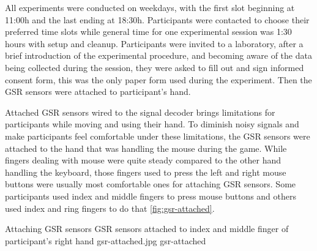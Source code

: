 All experiments were conducted on weekdays, with the first slot beginning at 11:00h and the last ending at 18:30h. Participants were contacted to choose their preferred time slots while general time for one experimental session was 1:30 hours with setup and cleanup. Participants were invited to a laboratory, after a brief introduction of the experimental procedure, and becoming aware of the data being collected during the session, they were asked to fill out and sign informed consent form, this was the only paper form used during the experiment. Then the GSR sensors were attached to participant's hand.

Attached GSR sensors wired to the signal decoder brings limitations for participants while moving and using their hand. To diminish noisy signals and make participants feel comfortable under these limitations, the GSR sensors were attached to the hand that was handling the mouse during the game. While fingers dealing with mouse were quite steady compared to the other hand handling the keyboard, those fingers used to press the left and right mouse buttons were usually most comfortable ones for attaching GSR sensors. Some participants used index and middle fingers to press mouse buttons and others used index and ring fingers to do that \ref{fig:gsr-attached}.

\img
{Attaching GSR sensors}
{GSR sensors attached to index and middle finger of participant's right hand}
{gsr-attached.jpg}
{gsr-attached}

